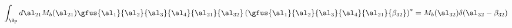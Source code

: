 \begin{equation}
\int_{\Sp}d\al_{21}M_{b}(\al_{21})\gfus{\al_1}{\al_2}{\al_3}{\al_4}{\al_{21}}{\al_{32}}
\left(\gfus{\al_1}{\al_2}{\al_3}{\al_4}{\al_{21}}{\beta_{32}}\right)^{*}
= M_{b}(\al_{32})\delta(\al_{32}-\beta_{32}) \label{ortho
G}\nonumber
\end{equation}

